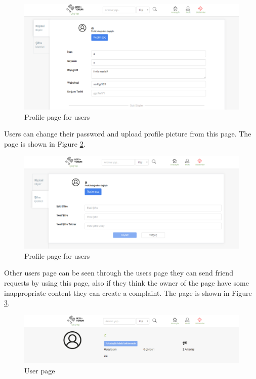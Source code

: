 \begin{figure}[!htbp]
\centering
\includegraphics[width=\textwidth]{projectChapters/images/profileWeb2.png}
\caption{Profile page for users}
\label{fig:profileWeb2}
\end{figure}

Users can change their password and upload profile picture from this page. The page is shown in Figure  \ref{fig:profileWeb3}.

\begin{figure}[!htbp]
\centering
\includegraphics[width=\textwidth]{projectChapters/images/profileWeb3.png}
\caption{Profile page for users}
\label{fig:profileWeb3}
\end{figure}

\newpage

Other users page can be seen through the users page they can send friend requests by using this page, also if they think the owner of the page have some inappropriate content they can create a complaint. The page is shown in Figure   \ref{fig:userpageWeb}.

\begin{figure}[!htbp]
\centering
\includegraphics[width=\textwidth]{projectChapters/images/userpageWeb.png}
\caption{User page}
\label{fig:userpageWeb}
\end{figure}

